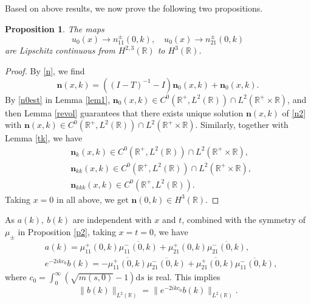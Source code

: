 \documentclass[11pt]{article}
\numberwithin{equation}{section}
\newtheorem{Proposition}{Proposition}
\begin{document}
 Based on above results, we now prove the following two  propositions.

\begin{Proposition}\label{p5}
The maps
\begin{equation*}
u_0(x)\to n_{11}^{\pm}(0,k),\quad u_0(x)\to n_{21}^{\pm}(0,k)
\end{equation*}
are Lipschitz continuous from $H^{2,3}(\mathbb{R})$ to $H^{3}(\mathbb{R})$.
\end{Proposition}

\begin{proof} By \eqref{n}, we find
\begin{equation}\label{n2}
  \textbf{n}(x,k)=((I-T)^{-1}-I)\textbf{n}_0(x,k)+\textbf{n}_0(x,k).
\end{equation}
By \eqref{n0est} in Lemma \ref{lem1}, $\textbf{n}_0(x,k)\in C^0(\mathbb{R}^+,L^2(\mathbb{R}))\cap L^2(\mathbb{R}^+\times\mathbb{R})$,
and then Lemma \ref{revol} guarantees that there exists unique solution $\textbf{n}(x,k)$ of \eqref{n2} with $\textbf{n}(x,k)\in C^0(\mathbb{R}^+,L^2(\mathbb{R}))\cap L^2(\mathbb{R}^+\times\mathbb{R})$.
Similarly, together with Lemma \ref{tk}, we have
\begin{equation*}
\begin{aligned}
&\textbf{n}_k(x,k)\in C^0(\mathbb{R}^+,L^2(\mathbb{R}))\cap L^2(\mathbb{R}^+\times\mathbb{R}),\\
&\textbf{n}_{kk}(x,k)\in C^0(\mathbb{R}^+,L^2(\mathbb{R}))\cap L^2(\mathbb{R}^+\times\mathbb{R}),\\
&\textbf{n}_{kkk}(x,k)\in C^0(\mathbb{R}^+,L^2(\mathbb{R})).
\end{aligned}
\end{equation*}
Taking $x=0$ in all above, we get $\textbf{n}(0,k)\in H^3(\mathbb{R})$.
\end{proof}

  As $a(k),\ b(k)$ are independent with $x$ and $t$, combined with the symmetry of $\mu_\pm$ in Proposition \ref{p2}, taking $x=t=0$, we have
\begin{align}
&a(k)=\mu_{11}^+(0,k)\overline{\mu_{11}^-(0,k)}+\mu_{21}^+(0,k)\overline{\mu_{21}^-(0,k)},\nonumber\\
&e^{-2ikc_0}{b(k)}=-\overline{\mu_{11}^+(0,k)}\overline{\mu_{21}^-(0,k)}+\overline{\mu_{21}^+(0,k)}\overline{\mu_{11}^-(0,k)},\nonumber
\end{align}
where $c_0=\int_0^{\infty}(\sqrt{m(s,0)}-1)\mathrm{d}s$ is real. This implies
\begin{equation}
    \|b(k)\|_{L^2(\mathbb{R})}=\| e^{-2ikc_0}b(k)\|_{L^2(\mathbb{R})}.
\end{equation}
\end{document}
